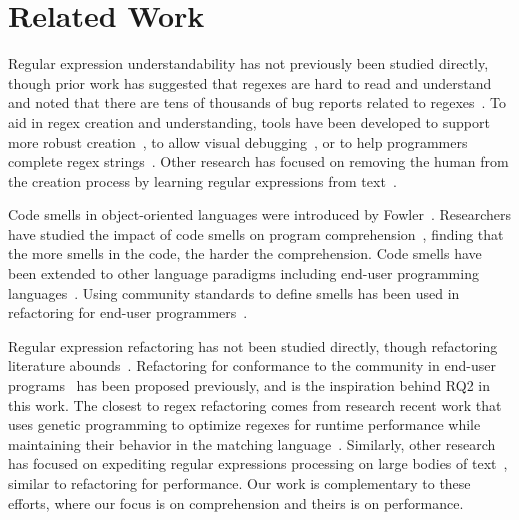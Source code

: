 \section{Related Work}
\label{sec:related}
Regular expression understandability has not previously been studied directly, though prior work has suggested that regexes are hard to read and understand~\cite{chapman2016} and noted that there are tens of thousands of bug reports related to regexes~\cite{Spishak:2012:TSR:2318202.2318207}. 
To aid in regex creation and understanding, tools have been developed to support more robust creation~\cite{Spishak:2012:TSR:2318202.2318207}, to allow visual debugging~\cite{Beck:2014:RVD:2591062.2591111}, or to help programmers complete regex strings~\cite{Omar:2012:ACC:2337223.2337324}. Other research has focused on removing the human from the creation process by learning regular expressions from text~\cite{Babbar:2010:CBA:1871840.1871848, Li:2008:REL:1613715.1613719}.

Code smells in object-oriented languages were introduced by Fowler~\cite{Fowl1999}. Researchers have studied the impact of code smells on program comprehension~\cite{abbes2011empirical, du2006does}, finding that the more smells in the code, the harder the comprehension. 
Code smells have been extended to other language paradigms including end-user programming languages~\cite{Hermans2012intra, Hermans2012intraExt, stoleeicse, stolee2013identification}. 
Using community standards to define smells has been used in refactoring for end-user programmers~\cite{stoleeicse, stolee2013identification}. 

Regular expression refactoring has not been studied directly, though refactoring literature abounds~\cite{Mens:2004:SSR:972215.972286, opdyke1992refactoring, Griswold:1993:AAP:152388.152389}. 
Refactoring for conformance to the community in end-user programs~\cite{stoleeicse, stoleeTSE} has been proposed previously, and is the inspiration behind RQ2 in this work.
The closest to regex refactoring comes from research recent work that uses genetic programming to optimize regexes for runtime performance while maintaining their behavior in the matching language~\cite{cody2017search}. 
Similarly, other research has focused on expediting regular expressions processing on large bodies of text~\cite{Baeza-Yates:1996:FTS:235809.235810}, similar to refactoring for performance. 
Our work is complementary to these efforts, where our focus is on comprehension and theirs is on performance. 

